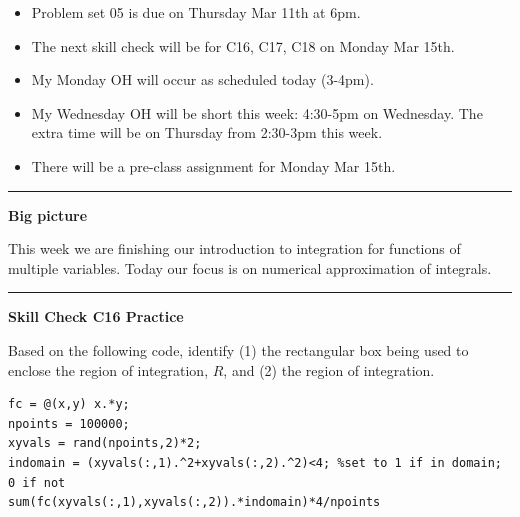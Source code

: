\documentclass[12pt,letterpaper,noanswers]{exam}
\begin{document}
 \pdfpageheight 11in 
  \pdfpagewidth 8.5in





\begin{itemize}
\itemsep0em
    \item Problem set 05 is due on Thursday Mar 11th at 6pm.
    \item The next skill check will be for C16, C17, C18 on Monday Mar 15th.
    \item My Monday OH will occur as scheduled today (3-4pm).
    \item My Wednesday OH will be short this week: 4:30-5pm on Wednesday.  The extra time will be on Thursday from 2:30-3pm this week.
    \item There will be a pre-class assignment for Monday Mar 15th.
\end{itemize}

\hrule
\vspace{0.2cm}


\noindent\textbf{Big picture}

This week we are finishing our introduction to integration for functions of multiple variables.  Today our focus is on numerical approximation of integrals.

\vspace{0.2cm}
\hrule
\vspace{0.2cm}



\noindent\textbf{Skill Check C16 Practice}
\begin{questions}
\question Based on the following code, identify (1) the rectangular box being used to enclose the region of integration, $R$, and (2) the region of integration.

\begin{lstlisting}
fc = @(x,y) x.*y;
npoints = 100000;
xyvals = rand(npoints,2)*2;
indomain = (xyvals(:,1).^2+xyvals(:,2).^2)<4; %set to 1 if in domain; 0 if not
sum(fc(xyvals(:,1),xyvals(:,2)).*indomain)*4/npoints
\end{lstlisting}

\end{questions}
\end{document}
